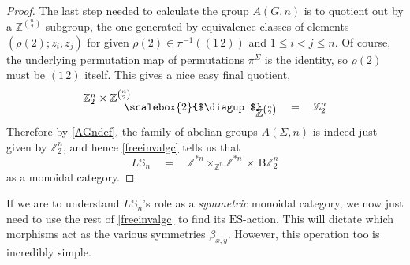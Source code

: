 \documentclass{amsbook} %
\newcommand{\bigquotient}[2]{ \raisebox{0.75\height}{$#1$} \mkern-12mu\scalebox{2}{$\diagup$}\mkern-10mu \raisebox{-0.5\height}{$#2$} }
\numberwithin{section}{chapter}
\begin{document}
\begin{proof}
The last step needed to calculate the group $A(G,n)$ is to quotient out by a $\mathbb{Z}^{{n}\choose{2}}$ subgroup, the one generated by equivalence classes of elements $(\rho(2) ; z_i, z_j )$ for given $\rho(2) \in \pi^{-1}((1 \, 2))$ and $1 \le i < j \le n$. Of course, the underlying permutation map of permutations $\pi^{\Sigma}$ is the identity, so $\rho(2)$ must be $(1 \, 2)$ itself. This gives a nice easy final quotient,
\[ \bigquotient{\mathbb{Z}_2^{n} \times \mathbb{Z}^{{n}\choose{2}}}{\mathbb{Z}^{{n}\choose{2}}} \quad = \quad \mathbb{Z}_2^{n}\]
Therefore by \cref{AGndef}, the family of abelian groups $A(\Sigma,n)$ is indeed just given by $\mathbb{Z}_2^{n}$, and hence \cref{freeinvalgc} tells us that
\[ L\mathbb{S}_n \quad = \quad \mathbb{Z}^{\ast n} \times_{\mathbb{Z}^n} \mathbb{Z}^{\ast n}  \, \times \, \mathrm{B}\mathbb{Z}_2^{n} \]
as a monoidal category.
\end{proof} 

If we are to understand $L\mathbb{S}_n$'s role as a \emph{symmetric} monoidal category, we now just need to use the rest of \cref{freeinvalgc} to find its $\mathrm{ES}$-action. This will dictate which morphisms act as the various symmetries $\beta_{x, y}$. However, this operation too is incredibly simple.
\end{document}
